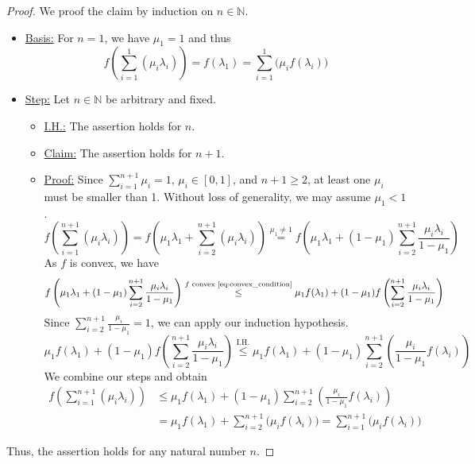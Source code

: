 \begin{proof}
We proof the claim by induction on $n\in\mathbb{N}$.
\begin{itemize}
\item\underline{Basis:} For $n=1$, we have $\mu_1=1$ and thus
\begin{equation*}
	f\left(\sum\limits_{i=1}^1(\mu_i\lambda_i)\right)=f(\lambda_1)=\sum\limits_{i=1}^1\bigl(\mu_if(\lambda_i)\bigr)
\end{equation*}
\item\underline{Step:} Let $n\in\mathbb{N}$ be arbitrary and fixed.
\begin{itemize}
	\item\underline{I.H.:} The assertion holds for $n$.
	\item\underline{Claim:} The assertion holds for $n+1$.
	\item\underline{Proof:} Since $\sum\limits_{i=1}^{n+1}\mu_i=1$, $\mu_i\in[0,1]$, and $n+1\ge 2$, at least one $\mu_i$ must be smaller than 1. Without loss of generality, we may assume $\mu_1<1$.
	\begin{equation*}
		f\left(\sum\limits_{i=1}^{n+1}(\mu_i\lambda_i)\right)=f\left(\mu_1\lambda_1+\sum\limits_{i=2}^{n+1}(\mu_i\lambda_i)\right)\stackrel{\mu_1\neq1}{=}f\left(\mu_1\lambda_1+(1-\mu_1)\sum\limits_{i=2}^{n+1}\frac{\mu_i\lambda_i}{1-\mu_1}\right)
	\end{equation*}
	As $f$ is convex, we have
	\begin{equation*}
		f\left(\mu_1\lambda_1+(1-\mu_1)\sum\limits_{i=2}^{n+1}\frac{\mu_i\lambda_i}{1-\mu_1}\right)\stackrel{f\text{ convex~\eqref{eq:convex_condition}}}{\le} \mu_1f(\lambda_1)+(1-\mu_1)f\left(\sum\limits_{i=2}^{n+1}\frac{\mu_i\lambda_i}{1-\mu_1}\right)
	\end{equation*}
	Since $\sum\limits_{i=2}^{n+1}\frac{\mu_i}{1-\mu_1}=1$, we can apply our induction hypothesis.
	\begin{equation*}
		\mu_1f(\lambda_1)+(1-\mu_1)f\left(\sum\limits_{i=2}^{n+1}\frac{\mu_i\lambda_i}{1-\mu_1}\right)\stackrel{\text{I.H.}}{\le} \mu_1f(\lambda_1)+(1-\mu_1)\sum\limits_{i=2}^{n+1}\left(\frac{\mu_i}{1-\mu_1}f(\lambda_i)\right)
	\end{equation*}
	We combine our steps and obtain
	\begin{align*}
		f\left(\sum\limits_{i=1}^{n+1}(\mu_i\lambda_i)\right)&\le \mu_1f(\lambda_1)+(1-\mu_1)\sum\limits_{i=2}^{n+1}\left(\frac{\mu_i}{1-\mu_1}f(\lambda_i)\right)\\
		&=\mu_1f(\lambda_1)+\sum\limits_{i=2}^{n+1}\bigl(\mu_if(\lambda_i)\bigr)=\sum_{i=1}^{n+1}\bigl(\mu_i f(\lambda_i)\bigr)
	\end{align*}
\end{itemize}
\end{itemize}
Thus, the assertion holds for any natural number $n$.
\end{proof}
